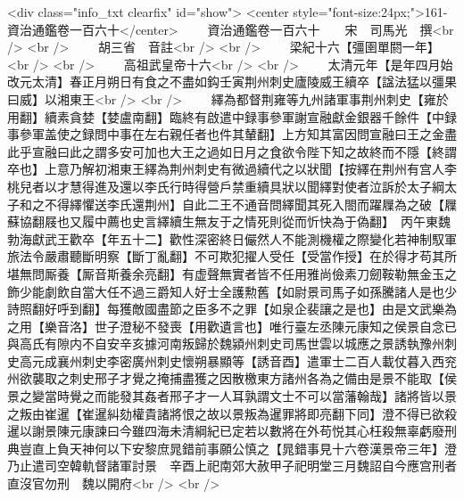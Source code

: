 <div class="info_txt clearfix" id="show">
<center style="font-size:24px;">161-資治通鑑卷一百六十</center>
  　　資治通鑑卷一百六十　　宋　司馬光　撰<br />
<br />
　　胡三省　音註<br />
<br />
　　梁紀十六【彊圉單閼一年】<br />
<br />
　　高祖武皇帝十六<br />
<br />
　　太清元年【是年四月始改元太清】春正月朔日有食之不盡如鈎壬寅荆州刺史廬陵威王續卒【諡法猛以彊果曰威】以湘東王<br />
<br />
　　繹為都督荆雍等九州諸軍事荆州刺史【雍於用翻】續素貪婪【婪盧南翻】臨終有啟遣中録事參軍謝宣融獻金銀器千餘件【中録事參軍盖使之録問中事在左右親任者也件其輦翻】上方知其富因問宣融曰王之金盡此乎宣融曰此之謂多安可加也大王之過如日月之食欲令陛下知之故終而不隱【終謂卒也】上意乃解初湘東王繹為荆州刺史有微過續代之以狀聞【按繹在荆州有宫人李桃兒者以才慧得進及還以李氏行時得營戶禁重續具狀以聞繹對使者泣訴於太子綱太子和之不得繹懼送李氏還荆州】自此二王不通音問繹聞其死入閤而躍屧為之破【屧蘇協翻屐也又履中薦也史言繹續生無友于之情死則從而忻快為于偽翻】　丙午東魏勃海獻武王歡卒【年五十二】歡性深密終日儼然人不能測機權之際變化若神制馭軍旅法令嚴肅聽斷明察【斷丁亂翻】不可欺犯擢人受任【受當作授】在於得才苟其所堪無問厮養【厮音斯養余亮翻】有虚聲無實者皆不任用雅尚儉素刀劒鞍勒無金玉之飾少能劇飲自當大任不過三爵知人好士全護勲舊【如尉景司馬子如孫騰諸人是也少詩照翻好呼到翻】每獲敵國盡節之臣多不之罪【如泉企裴讓之是也】由是文武樂為之用【樂音洛】世子澄秘不發喪【用歡遺言也】唯行臺左丞陳元康知之侯景自念已與高氏有隙内不自安辛亥據河南叛歸於魏潁州刺史司馬世雲以城應之景誘執豫州刺史高元成襄州刺史李密廣州刺史懷朔暴顯等【誘音酉】遣軍士二百人載仗暮入西兖州欲襲取之刺史邢子才覺之掩捕盡獲之因散檄東方諸州各為之備由是景不能取【侯景之變當時覺之而能發其姦者邢子才一人耳孰謂文士不可以當藩翰哉】諸將皆以景之叛由崔暹【崔暹糾劾權貴諸將恨之故以景叛為暹罪將即亮翻下同】澄不得已欲殺暹以謝景陳元康諫曰今雖四海未清綱紀已定若以數將在外苟悦其心枉殺無辜虧廢刑典豈直上負天神何以下安黎庶晁錯前事願公慎之【晁錯事見十六卷漢景帝三年】澄乃止遣司空韓軌督諸軍討景　辛酉上祀南郊大赦甲子祀明堂三月魏詔自今應宫刑者直沒官勿刑　魏以開府<br />
<br />
